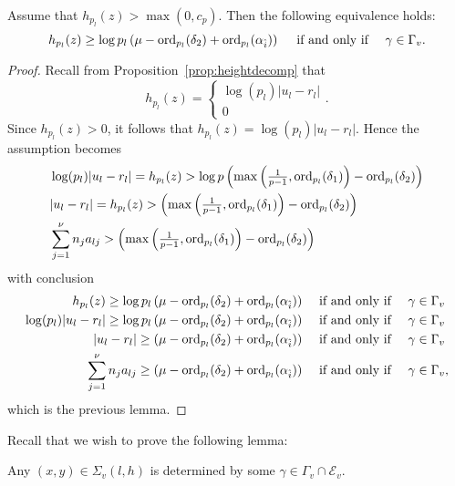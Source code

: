 \begin{corollary}
Assume that $h_{p_l}(z)>\max(0,c_p)$. Then the following equivalence holds: 
\[h_{p_l}(z)\geq \log{p_l}\left(\mu - \operatorname{ord}_{p_l}(\delta_2) + \operatorname{ord}_{p_l}(\alpha_{\hat{i}})\right) \quad \text{ if and only if } \quad \gamma \in\Gamma_v.\]
\end{corollary}
\begin{proof}
Recall from Proposition~\ref{prop:heightdecomp} that 
\[h_{p_l}(z) = 
\begin{cases}
\log(p_l)|u_l - r_l| \\
0
\end{cases}.\]
Since $h_{p_l}(z) > 0$, it follows that $h_{p_l}(z) = \log(p_l)|u_l - r_l|$. Hence the assumption becomes
\begin{align*}
&\log(p_l)|u_l - r_l| = h_{p_l}(z) > \log p\left(\max\left(\tfrac{1}{p-1},\operatorname{ord}_{p_l}(\delta_1)\right)-\operatorname{ord}_{p_l}(\delta_2)\right)\\
&|u_l - r_l| = h_{p_l}(z) > \left(\max\left(\tfrac{1}{p-1},\operatorname{ord}_{p_l}(\delta_1)\right)-\operatorname{ord}_{p_l}(\delta_2)\right) \\
& \sum_{j = 1}^{\nu}n_ja_{lj} > \left(\max\left(\tfrac{1}{p-1},\operatorname{ord}_{p_l}(\delta_1)\right)-\operatorname{ord}_{p_l}(\delta_2)\right)
\end{align*}
with conclusion
\begin{align*}
h_{p_l}(z)\geq \log{p_l}\left(\mu - \operatorname{ord}_{p_l}(\delta_2) + \operatorname{ord}_{p_l}(\alpha_{\hat{i}})\right) 
	& \quad \text{ if and only if } \quad \gamma \in\Gamma_v\\
\log(p_l)|u_l - r_l| \geq \log{p_l}\left(\mu - \operatorname{ord}_{p_l}(\delta_2) + \operatorname{ord}_{p_l}(\alpha_{\hat{i}})\right) 
	&\quad \text{ if and only if } \quad \gamma \in\Gamma_v\\
|u_l - r_l| \geq \left(\mu - \operatorname{ord}_{p_l}(\delta_2) + \operatorname{ord}_{p_l}(\alpha_{\hat{i}})\right) 
	& \quad \text{ if and only if } \quad \gamma \in\Gamma_v\\
\sum_{j = 1}^{\nu}n_ja_{lj} \geq \left(\mu - \operatorname{ord}_{p_l}(\delta_2) + \operatorname{ord}_{p_l}(\alpha_{\hat{i}})\right) 
	&\quad \text{ if and only if } \quad \gamma \in\Gamma_v,
\end{align*}
which is the previous lemma. 

\end{proof}

Recall that we wish to prove the following lemma:
\begin{lemma}\label{lem:nonarchsieve}
Any $(x,y) \in \Sigma_v(l,h)$ is determined by some $\gamma \in \Gamma_v \cap \mathcal{E}_v$. 
\end{lemma}

